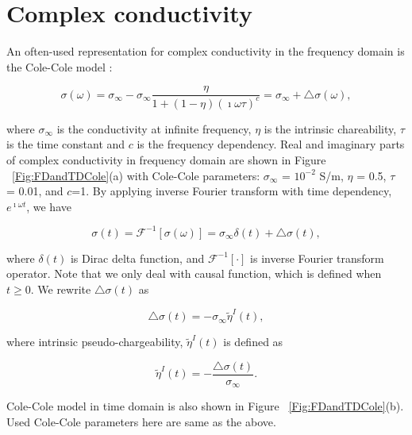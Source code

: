 \documentclass[extra,mreferee]{gji}
\newcommand{\siginf}{\sigma_\infty}
\newcommand{\dsig}{\triangle\sigma}
\newcommand{\peta}{\tilde{\eta}}
\begin{document}
\section{Complex conductivity}
An often-used representation for complex conductivity in the frequency domain is the Cole-Cole model \cite{COLE}:
\begin{linenomath*}
\begin{equation}
  \sigma(\omega) = \sigma_{\infty} - \sigma_{\infty}\frac{\eta}{1+(1-\eta)(\imath\omega\tau)^c} = \sigma_{\infty} + \triangle\sigma(\omega),
  \label{eq: sigma_freq}
\end{equation}
\end{linenomath*}
where $\sigma_{\infty}$ is the conductivity at infinite frequency, $\eta$ is the intrinsic chareability, $\tau$ is the time constant and $c$ is the frequency dependency. Real and imaginary parts of complex conductivity in frequency domain are shown in Figure ~\ref{Fig:FDandTDCole}(a) with Cole-Cole parameters: $\siginf$ = $10^{-2}$ S/m, $\eta $ = 0.5, $\tau$ = 0.01, and $c$=1. By applying inverse Fourier transform with time dependency, $e^{\imath\omega t}$, we have
\begin{linenomath*}
\begin{equation}
  \sigma(t) = \mathscr{F}^{-1}[\sigma(\omega)] = \sigma_{\infty}\delta(t) + \triangle\sigma(t),
  \label{eq: sigma_time}
\end{equation}
\end{linenomath*}
where $\delta(t)$ is Dirac delta function, and $\mathscr{F}^{-1}[\cdot]$ is inverse Fourier transform operator. Note that we only deal with causal function, which is defined when $t\ge 0$. 
We rewrite $\dsig(t)$ as 
\begin{linenomath*}
\begin{equation}
  \dsig(t) = - \siginf\peta^{I}(t),
  \label{eq: sigma_time_c1}
\end{equation}
\end{linenomath*}
where intrinsic pseudo-chargeability, $\peta^{I}(t)$ is defined as
\begin{linenomath*}
\begin{equation}
    \peta^{I}(t) = -\frac{\dsig(t)}{\siginf}. %
    \label{eq: intrinsic_peta}
\end{equation}
\end{linenomath*}
Cole-Cole model in time domain is also shown in Figure ~\ref{Fig:FDandTDCole}(b). Used Cole-Cole parameters here are same as the above.
\end{document}
